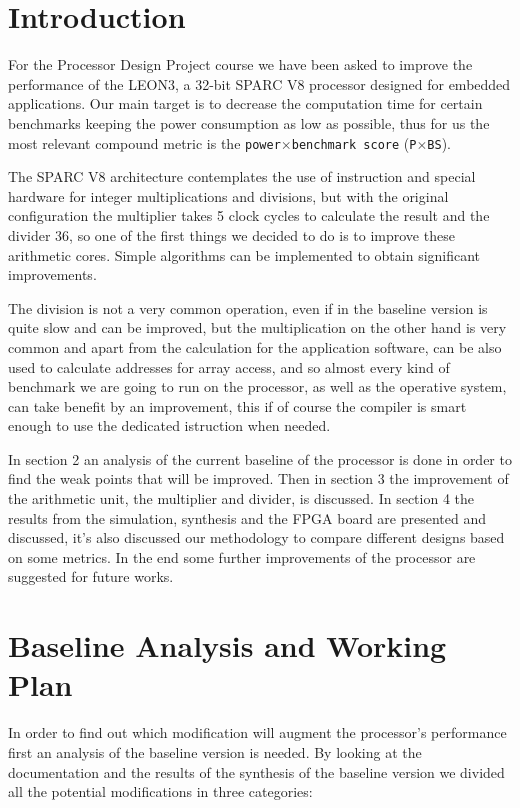 
\section{Introduction}

For the Processor Design Project course we have been asked to improve the performance of the
LEON3, a 32-bit SPARC V8 processor designed for embedded applications.
Our main target is to decrease the computation time for certain benchmarks keeping the power
consumption as low as possible, thus for us the most relevant compound metric is the
\texttt{power}$\times$\texttt{benchmark score} (\texttt{P}$\times$\texttt{BS}).

The SPARC V8 architecture contemplates the use of instruction and special hardware for integer
multiplications and divisions, but with the original configuration the multiplier takes 5 clock cycles
to calculate the result and the divider 36, so one of the first things we decided to do is to improve
these arithmetic cores. Simple algorithms can be implemented to obtain significant improvements.

The division is not a very common operation, even if in the baseline version is quite slow and can be improved, but the multiplication on the other hand is very common and apart from the calculation for the application software, can be also used to calculate addresses for array access, and so almost every kind of benchmark we are going to run on the processor, as well as the operative system, can take benefit by an improvement, this if of course the compiler is smart enough to use the dedicated istruction when needed.

In section 2 an analysis of the current baseline of the processor is done in order to find the weak points that will be improved.
Then in section 3 the improvement of the arithmetic unit, the multiplier and divider, is discussed.
In section 4 the results from the simulation, synthesis and the FPGA board are presented and discussed, it's also discussed our methodology to compare different designs based on some metrics.
In the end some further improvements of the processor are suggested for future works.

\pagebreak
\section{Baseline Analysis and Working Plan}

In order to find out which modification will augment the processor's performance first an analysis of the baseline version is needed.
By looking at the documentation and the results of the synthesis of the baseline version we divided all the potential modifications in three categories:


